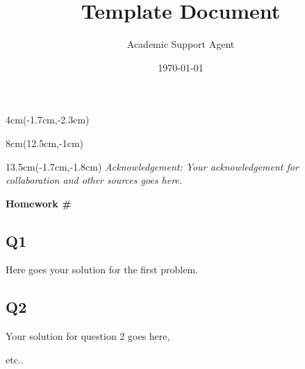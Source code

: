 \documentclass{article}
\title{Template Document}
\author{Academic Support Agent}
\date{\today}
\begin{document}
\maketitle



\begin{textblock*}{4cm}(-1.7cm,-2.3cm)
\end{textblock*}

\begin{textblock*}{8cm}(12.5cm,-1cm)
\end{textblock*}
\begin{textblock*}{13.5cm}(-1.7cm,-1.8cm)
\noindent \textit{\footnotesize Acknowledgement: Your acknowledgement for collaboration and other sources goes here. } 
\end{textblock*}

\vspace{1cm}

\begin{center}
\textbf{\Large Homework \#}
\end{center}


\subsection*{Q1} Here goes your solution for the first problem.



\subsection*{Q2}
Your solution for question 2 goes here, 


etc..
\end{document}
